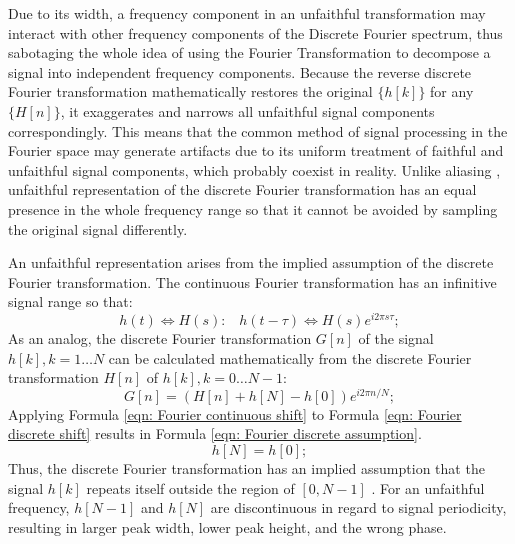 \documentclass[twoside]{article}
\numberwithin{equation}{section}
\newcommand{\eqspace}{\;\;\;}
\begin{document}
Due to its width, a frequency component in an unfaithful transformation may interact with other frequency components of the Discrete Fourier spectrum, thus sabotaging the whole idea of using the Fourier Transformation to decompose a signal into independent frequency components.  
Because the reverse discrete Fourier transformation mathematically restores the original $\{h[k]\}$ for any $\{H[n]\}$, it exaggerates and narrows all unfaithful signal components correspondingly.  
This means that the common method of signal processing in the Fourier space \cite{Numerical_Recipes}\cite{Stochastic_Arithmetic}\cite{Floating-point_Digital_Filters} may generate artifacts due to its uniform treatment of faithful and unfaithful signal components, which probably coexist in reality.  
Unlike aliasing \cite{Electronics}\cite{Numerical_Recipes}\cite{Floating-point_Digital_Filters}, unfaithful representation of the discrete Fourier transformation has an equal presence in the whole frequency range so that it cannot be avoided by sampling the original signal differently.

An unfaithful representation arises from the implied assumption of the discrete Fourier transformation.  
The continuous Fourier transformation has an infinitive signal range so that:
\begin{equation}
\label{eqn: Fourier continuous shift}
h(t) \Leftrightarrow H(s): \eqspace h(t - \tau) \Leftrightarrow H(s) e^{i 2\pi s \tau};
\end{equation}
As an analog, the discrete Fourier transformation $G[n]$ of the signal $h[k], k = 1 \dots N$ can be calculated mathematically from the discrete Fourier transformation $H[n]$ of $h[k], k = 0\dots N-1$:
\begin{equation}
\label{eqn: Fourier discrete shift}
G[n] = (H[n] + h[N] - h[0]) e^{i 2\pi n/N};
\end{equation}
Applying Formula \eqref{eqn: Fourier continuous shift} to Formula \eqref{eqn: Fourier discrete shift} results in Formula \eqref{eqn: Fourier discrete assumption}.
\begin{equation}
\label{eqn: Fourier discrete assumption}
h[N] = h[0];
\end{equation}
Thus, the discrete Fourier transformation has an implied assumption that the signal $h[k]$ repeats itself outside the region of $[0, N-1]$ \cite{Numerical_DFT}.  
For an unfaithful frequency, $h[N-1]$ and $h[N]$ are discontinuous in regard to signal periodicity, resulting in larger peak width, lower peak height, and the wrong phase.  
\end{document}
